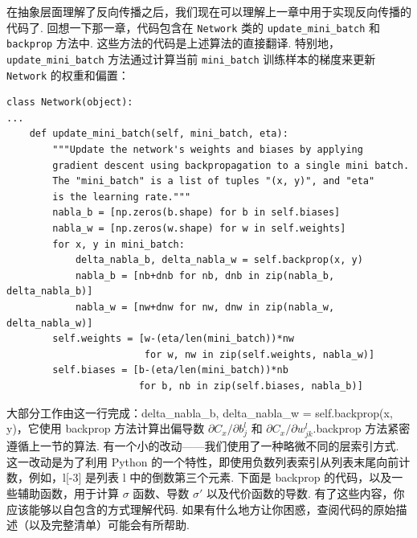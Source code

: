在抽象层面理解了反向传播之后，我们现在可以理解上一章中用于实现反向传播的代码了. 回想一下那一章，代码包含在 \texttt{Network} 类的 \texttt{update\_\allowbreak{}mini\_\allowbreak{}batch} 和 \texttt{backprop} 方法中. 这些方法的代码是上述算法的直接翻译. 特别地，\texttt{update\_\allowbreak{}mini\_\allowbreak{}batch} 方法通过计算当前 \texttt{mini\_\allowbreak{}batch} 训练样本的梯度来更新 \texttt{Network} 的权重和偏置：

\begin{lstlisting}
class Network(object):
...
    def update_mini_batch(self, mini_batch, eta):
        """Update the network's weights and biases by applying
        gradient descent using backpropagation to a single mini batch.
        The "mini_batch" is a list of tuples "(x, y)", and "eta"
        is the learning rate."""
        nabla_b = [np.zeros(b.shape) for b in self.biases]
        nabla_w = [np.zeros(w.shape) for w in self.weights]
        for x, y in mini_batch:
            delta_nabla_b, delta_nabla_w = self.backprop(x, y)
            nabla_b = [nb+dnb for nb, dnb in zip(nabla_b, delta_nabla_b)]
            nabla_w = [nw+dnw for nw, dnw in zip(nabla_w, delta_nabla_w)]
        self.weights = [w-(eta/len(mini_batch))*nw
                        for w, nw in zip(self.weights, nabla_w)]
        self.biases = [b-(eta/len(mini_batch))*nb
                       for b, nb in zip(self.biases, nabla_b)]

\end{lstlisting}

大部分工作由这一行完成：delta\_\allowbreak{}nabla\_\allowbreak{}b, delta\_\allowbreak{}nabla\_\allowbreak{}w = self.backprop(x, y)，它使用 backprop 方法计算出偏导数 $\partial C_x / \partial b^l_j$ 和 $\partial C_x / \partial w^l_{jk}$.backprop 方法紧密遵循上一节的算法. 有一个小的改动——我们使用了一种略微不同的层索引方式. 这一改动是为了利用 Python 的一个特性，即使用负数列表索引从列表末尾向前计数，例如，l[-3] 是列表 l 中的倒数第三个元素. 下面是 backprop 的代码，以及一些辅助函数，用于计算 $\sigma$ 函数、导数 $\sigma'$ 以及代价函数的导数. 有了这些内容，你应该能够以自包含的方式理解代码. 如果有什么地方让你困惑，查阅代码的原始描述（以及完整清单）可能会有所帮助.

